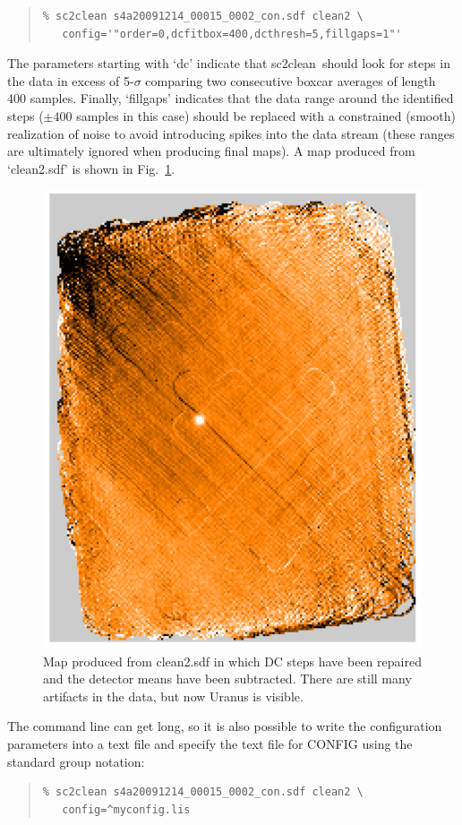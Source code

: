 \documentclass[twoside,11pt]{article}
\newcommand{\xref}[3]{#1}
\renewcommand{\_}{\texttt{\symbol{95}}}
\newenvironment{myquote}{\begin{quote}\begin{small}}{\end{small}\end{quote}}
\newcommand{\task}[1]{\textsf{#1}}
\newcommand{\clean}{\xref{\task{sc2clean}}{sun258}{SC2CLEAN}}
\begin{document}
\begin{myquote}
\begin{verbatim}
% sc2clean s4a20091214_00015_0002_con.sdf clean2 \
   config='"order=0,dcfitbox=400,dcthresh=5,fillgaps=1"'
\end{verbatim}
\end{myquote}

The parameters starting with `dc' indicate that \clean\ should look
for steps in the data in excess of 5-$\sigma$ comparing two
consecutive boxcar averages of length 400 samples.  Finally,
`fillgaps' indicates that the data range around the identified steps
($\pm 400$ samples in this case) should be replaced with a constrained
(smooth) realization of noise to avoid introducing spikes into the
data stream (these ranges are ultimately ignored when producing
final maps). A map produced from `clean2.sdf' is shown in
Fig.~\ref{fig:map_dc_mean}.

\begin{figure}
\begin{center}
\includegraphics[width=0.5\linewidth]{sc19_map_mean_dc}
\caption{Map produced from clean2.sdf in which DC steps have been
  repaired and the detector means have been subtracted. There are
  still many artifacts in the data, but now Uranus is visible.}
\label{fig:map_dc_mean}
\end{center}
\end{figure}

The command line can get long, so it is also possible to write the
configuration parameters into a text file and specify the text file
for CONFIG using the standard group notation:

\begin{myquote}
\begin{verbatim}
% sc2clean s4a20091214_00015_0002_con.sdf clean2 \
   config=^myconfig.lis
\end{verbatim}
\end{myquote}
\end{document}
